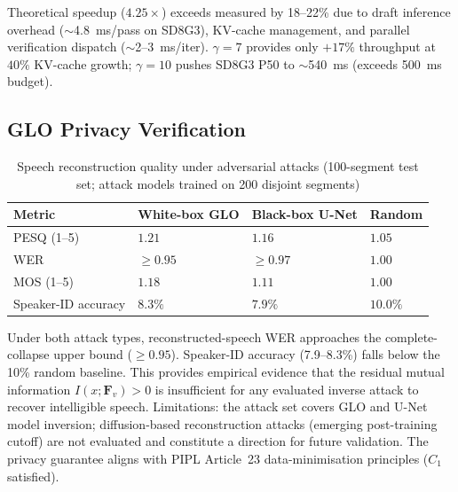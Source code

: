 \documentclass[lettersize,journal]{IEEEtran}
\begin{document}
Theoretical speedup ($4.25\times$) exceeds measured by 18--22\% due
to draft inference overhead ($\sim$4.8~ms/pass on SD8G3), KV-cache
management, and parallel verification dispatch ($\sim$2--3~ms/iter).
$\gamma=7$ provides only $+17\%$ throughput at $40\%$ KV-cache growth;
$\gamma=10$ pushes SD8G3 P50 to $\sim$540~ms (exceeds 500~ms budget).

\subsection{GLO Privacy Verification}
\label{sec:privacy_exp}

\begin{table}[htbp]
\caption{Speech reconstruction quality under adversarial attacks
(100-segment test set; attack models trained on 200 disjoint segments)}
\label{tab:privacy_attack}
\centering
\renewcommand{\arraystretch}{1.25}
\small
\begin{tabular}{l>{\centering\arraybackslash}p{1.5cm}>{\centering\arraybackslash}p{1.7cm}%
                >{\centering\arraybackslash}p{1.4cm}}
\toprule
\textbf{Metric} & \textbf{White-box GLO} & \textbf{Black-box U-Net} & \textbf{Random} \\
\midrule
PESQ (1--5)             & $1.21$ & $1.16$ & $1.05$ \\
WER                     & $\ge 0.95$ & $\ge 0.97$ & $1.00$ \\
MOS (1--5)              & $1.18$ & $1.11$ & $1.00$ \\
Speaker-ID accuracy     & $8.3\%$ & $7.9\%$ & $10.0\%$ \\
\bottomrule
\end{tabular}
\end{table}

Under both attack types, reconstructed-speech WER approaches the
complete-collapse upper bound ($\ge 0.95$).  Speaker-ID accuracy
(7.9--8.3\%) falls below the 10\% random baseline.  This provides
empirical evidence that the residual mutual information $I(x;
\bm{F}_v)>0$ is insufficient for any evaluated inverse attack to
recover intelligible speech.  Limitations: the attack set covers
GLO and U-Net model inversion; diffusion-based reconstruction attacks
(emerging post-training cutoff) are not evaluated and constitute a
direction for future validation.  The privacy guarantee aligns with
PIPL Article~23 data-minimisation principles ($C_1$ satisfied).

\end{document}
